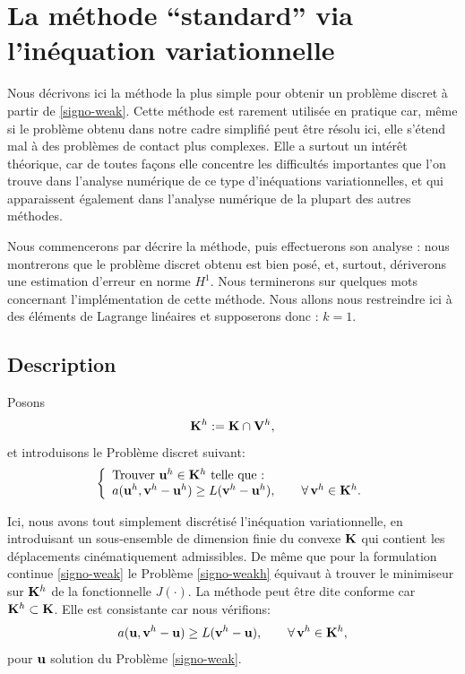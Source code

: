 \documentclass[11pt]{book}
\def\u{{\bf u}}
\def\vv{{\bf v}}
\def\V{{\bf V}}
\def\K{{\bf K}}
\begin{document}
\section{La méthode ``standard'' via l'inéquation variationnelle}

Nous décrivons ici la méthode la plus simple pour obtenir un problème discret à partir de \eqref{signo-weak}. Cette méthode est rarement utilisée en pratique car, même si le problème obtenu dans notre cadre simplifié peut être résolu ici, elle s'étend mal à des problèmes de contact plus complexes. Elle a surtout un intérêt théorique, car de toutes façons elle concentre les difficultés importantes que l'on trouve dans l'analyse numérique de ce type d'inéquations variationnelles, et qui apparaissent également dans l'analyse numérique de la plupart des autres méthodes.

Nous commencerons par décrire la méthode, puis effectuerons son analyse : nous montrerons que le problème discret obtenu est bien posé, et, surtout, dériverons une estimation d'erreur en norme $H^1$. Nous terminerons sur quelques mots concernant l'implémentation de cette méthode. Nous allons nous restreindre ici à des éléments de Lagrange linéaires et supposerons donc : $k=1$.

\subsection{Description}

Posons
\[
 \K^h := \K \cap \V^h,
\]
et introduisons le Problème discret suivant:
\begin{equation} \label{signo-weakh}
 \left\{
 \begin{array}{l}
 \hbox{Trouver } \u^h \in \K^h \hbox{ telle que :}\\
 a(\u^h,\vv^h - \u^h) \geq L(\vv^h -\u^h), \qquad \forall \, \vv^h \in \K^h.
 \end{array}
 \right.
\end{equation}

Ici, nous avons tout simplement discrétisé l'inéquation variationnelle, en introduisant un sous-ensemble de dimension finie du convexe $\K$ qui contient les déplacements cinématiquement admissibles. 
De même que pour la formulation continue \eqref{signo-weak} le Problème \eqref{signo-weakh} équivaut à trouver le minimiseur sur $\K^h$ de la fonctionnelle $J(\cdot)$.
La méthode peut être dite conforme car $\K^h \subset \K$. Elle est consistante car nous vérifions:
\[
 a(\u,\vv^h - \u) \geq L(\vv^h -\u), \qquad \forall \, \vv^h \in \K^h,
\]
pour $\u$ solution du Problème \eqref{signo-weak}.
\end{document}
